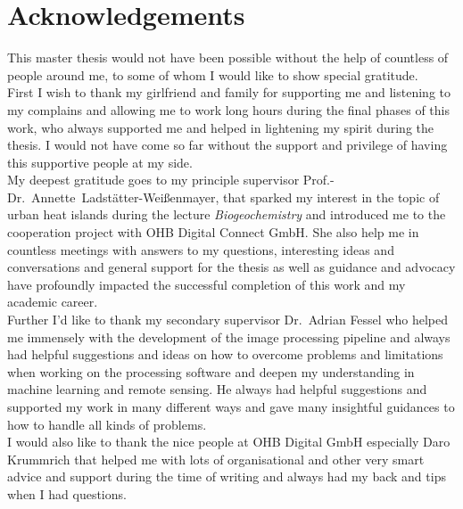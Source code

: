 \section*{Acknowledgements}
This master thesis would not have been possible without the help of countless of people around me, to some of whom I would like to show special gratitude. \\
%
First I wish to thank my girlfriend and family for supporting me and listening to my complains and allowing me to work long hours during the final phases of this work, who always supported me and helped in lightening my spirit during the thesis. 
I would not have come so far without the support and privilege of having this supportive people at my side.\\
%
My deepest gratitude goes to my principle supervisor Prof.-Dr.~Annette~Ladstätter-Weißenmayer, that sparked my interest in the topic of urban heat islands during the lecture \textit{Biogeochemistry} and introduced me to the cooperation project with OHB Digital Connect GmbH. 
She also help me in countless meetings with answers to my questions, interesting ideas and conversations and general support for the thesis as well as guidance and advocacy have profoundly impacted the successful completion of this work and my academic career. \\ 
%
Further I'd like to thank my secondary supervisor Dr.\ Adrian Fessel who helped me immensely with the development of the image processing pipeline and always had helpful suggestions and ideas on how to overcome problems and limitations when working on the processing software and deepen my understanding in machine learning and remote sensing. 
He always had helpful suggestions and supported my work in many different ways and gave many insightful guidances to how to handle all kinds of problems.\\
%
I would also like to thank the nice people at OHB Digital GmbH especially Daro Krummrich that helped me with lots of organisational and other very smart advice and support during the time of writing and always had my back and tips when I had questions.
%
%
%
\newpage
